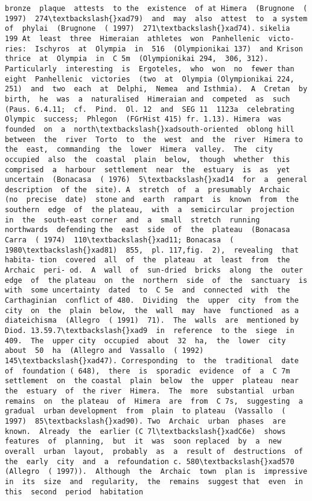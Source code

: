 \documentclass[11pt]{article}
\begin{document}
\begin{Verbatim}[commandchars=\\\{\}]
bronze  plaque  attests  to the  existence  of at Himera  (Brugnone  ( 1997)  274\textbackslash{}xad79)  and  may  also  attest  to  a system  of  phylai  (Brugnone  ( 1997)  271\textbackslash{}xad74). sikelia  199 At  least  three  Himeraian  athletes  won  Panhellenic  victo- ries:  Ischyros  at  Olympia  in  516  (Olympionikai 137)  and Krison  thrice  at  Olympia  in  C 5m  (Olympionikai 294,  306, 312).  Particularly  interesting  is  Ergoteles,  who  won  no  fewer than  eight  Panhellenic  victories  (two  at  Olympia (Olympionikai 224,  251)  and  two  each  at  Delphi,  Nemea  and Isthmia).  A  Cretan  by  birth,  he  was  a  naturalised  Himeraian and  competed  as  such  (Paus. 6.4.11;  cf.  Pind.  Ol. 12  and  SEG 11  1123a  celebrating  Olympic  success;  Phlegon  (FGrHist 415) fr. 1.13). Himera  was  founded  on  a  north\textbackslash{}xadsouth-oriented  oblong hill  between  the  river  Torto  to  the  west  and  the  river  Himera to  the  east,  commanding  the  lower  Himera  valley.  The  city occupied  also  the  coastal  plain  below,  though  whether  this comprised  a  harbour  settlement  near  the  estuary  is  as  yet uncertain  (Bonacasa  ( 1976)  5\textbackslash{}xad14  for  a  general  description  of the  site). A  stretch  of  a  presumably  Archaic  (no  precise  date)  stone and  earth  rampart  is  known  from  the  southern  edge  of  the plateau,  with  a  semicircular  projection  in  the  south-east corner  and  a  small  stretch  running  northwards  defending the  east  side  of  the  plateau  (Bonacasa  Carra  ( 1974)  110\textbackslash{}xad11; Bonacasa  ( 1980\textbackslash{}xad81)  855,  pl. 117,fig.  2),  revealing  that  habita- tion  covered  all  of  the  plateau  at  least  from  the  Archaic  peri- od.  A  wall  of  sun-dried  bricks  along  the  outer  edge  of  the plateau  on  the  northern  side  of  the  sanctuary  is  with  some uncertainty  dated  to  C 5e  and  connected  with  the Carthaginian  conflict of 480.  Dividing  the  upper  city  from the  city  on  the  plain  below,  the  wall  may  have  functioned  as a  diateichisma  (Allegro  ( 1991)  71).  The  walls  are  mentioned by Diod. 13.59.7\textbackslash{}xad9  in  reference  to the  siege  in  409.  The  upper city  occupied  about  32  ha,  the  lower  city  about  50  ha  (Allegro and  Vassallo  ( 1992)  145\textbackslash{}xad47). Corresponding  to  the  traditional  date  of  foundation ( 648),  there  is  sporadic  evidence  of  a  C 7m  settlement  on  the coastal  plain  below  the  upper  plateau  near  the  estuary  of  the river  Himera.  The  more  substantial  urban  remains  on  the plateau  of  Himera  are  from  C 7s,  suggesting  a  gradual  urban development  from  plain  to plateau  (Vassallo  ( 1997)  85\textbackslash{}xad90). Two  Archaic  urban  phases  are  known.  Already  the  earlier (C 7l\textbackslash{}xadC6e)  shows  features  of  planning,  but  it  was  soon replaced  by  a  new  overall  urban  layout,  probably  as  a  result of  destructions  of  the  early  city  and  a  refoundation c. 580\textbackslash{}xad570  (Allegro  ( 1997)).  Although  the  Archaic  town  plan is  impressive  in  its  size  and  regularity,  the  remains  suggest that  even  in  this  second  period  habitation  
\end{Verbatim}
\end{document}
